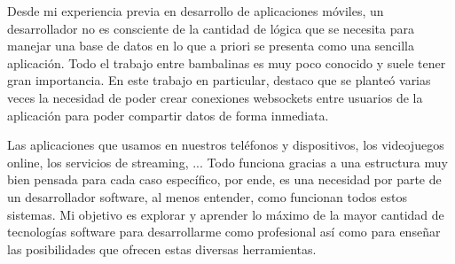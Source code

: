 Desde mi experiencia previa en desarrollo de aplicaciones móviles, un desarrollador no es consciente de la cantidad de lógica que se necesita para manejar una base
de datos en lo que a priori se presenta como una sencilla aplicación. Todo el trabajo entre bambalinas es muy poco conocido y suele tener gran importancia. En este trabajo en particular,
destaco que se planteó varias veces la necesidad de poder crear conexiones websockets entre usuarios de la aplicación para poder compartir datos de forma inmediata.

Las aplicaciones que usamos en nuestros teléfonos y dispositivos, los videojuegos online, los servicios de streaming, ... 
Todo funciona gracias a una estructura muy bien pensada para cada caso específico, por ende, es una necesidad por parte de un desarrollador software, 
al menos entender, como funcionan todos estos sistemas. Mi objetivo es explorar y aprender lo máximo de la mayor cantidad de tecnologías 
software para desarrollarme como profesional así como para enseñar las posibilidades que ofrecen estas diversas herramientas.
